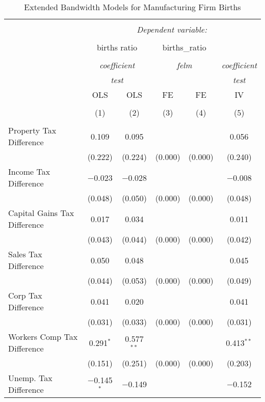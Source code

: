 
\begin{table}[!htbp] \centering 
  \caption{Extended Bandwidth Models for  Manufacturing Firm Births} 
  \label{} 
\begin{tabular}{@{\extracolsep{5pt}}lccccc} 
\\[-1.8ex]\hline 
\hline \\[-1.8ex] 
 & \multicolumn{5}{c}{\textit{Dependent variable:}} \\ 
\cline{2-6} 
\\[-1.8ex] & \multicolumn{2}{c}{births ratio} & \multicolumn{2}{c}{births\_ratio} &   \\ 
\\[-1.8ex] & \multicolumn{2}{c}{\textit{coefficient}} & \multicolumn{2}{c}{\textit{felm}} & \textit{coefficient} \\ 
 & \multicolumn{2}{c}{\textit{test}} & \multicolumn{2}{c}{\textit{}} & \textit{test} \\ 
 & OLS & OLS & FE & FE & IV \\ 
\\[-1.8ex] & (1) & (2) & (3) & (4) & (5)\\ 
\hline \\[-1.8ex] 
 Property Tax Difference & 0.109 & 0.095 &  &  & 0.056 \\ 
  & (0.222) & (0.224) & (0.000) & (0.000) & (0.240) \\ 
  Income Tax Difference & $-$0.023 & $-$0.028 &  &  & $-$0.008 \\ 
  & (0.048) & (0.050) & (0.000) & (0.000) & (0.048) \\ 
  Capital Gains Tax Difference & 0.017 & 0.034 &  &  & 0.011 \\ 
  & (0.043) & (0.044) & (0.000) & (0.000) & (0.042) \\ 
  Sales Tax Difference & 0.050 & 0.048 &  &  & 0.045 \\ 
  & (0.044) & (0.053) & (0.000) & (0.000) & (0.049) \\ 
  Corp Tax Difference & 0.041 & 0.020 &  &  & 0.041 \\ 
  & (0.031) & (0.033) & (0.000) & (0.000) & (0.031) \\ 
  Workers Comp Tax Difference & 0.291$^{*}$ & 0.577$^{**}$ &  &  & 0.413$^{**}$ \\ 
  & (0.151) & (0.251) & (0.000) & (0.000) & (0.203) \\ 
  Unemp. Tax Difference & $-$0.145$^{*}$ & $-$0.149 &  &  & $-$0.152 \\ 

\end{tabular}
\end{table}
